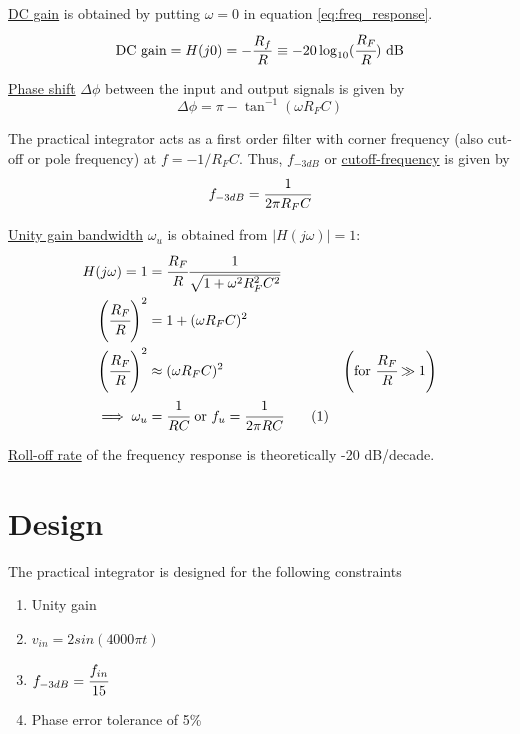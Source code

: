 \documentclass[12pt, titlepage]{article}
\theoremstyle{definition}
\newcommand\numberthis{\addtocounter{equation}{1}\tag{\theequation}}
\begin{document}
    \underline{DC gain} is obtained by putting $\omega = 0$ in equation \ref{eq:freq_response}.
    \begin{equation}
      \text{DC gain} = H(j0) = -\frac{R_f}{R} \equiv -20\log_{10}(\cfrac{R_F}{R}) \text{ dB}
    \end{equation}

    \underline{Phase shift} $\Delta\phi$ between the input and output signals is given by
    \begin{equation}\label{eq:phase_shift}
      \Delta\phi = \pi - \tan^{-1}(\omega R_FC)
    \end{equation}

    The practical integrator acts as a first order filter with corner frequency (also cut-off or pole frequency) at $f = -1/R_FC$.
    Thus, \underline{$f_{-3dB}$} or \underline{cutoff-frequency} is given by
    \begin{equation}\label{eq:f3db}
      f_{-3dB} = \cfrac{1}{2\pi R_FC}
    \end{equation}

    \underline{Unity gain bandwidth} $\omega_u$ is obtained from $|H(j\omega)| = 1$:
    \begin{align*}
      H(j\omega) = 1 &= \cfrac{R_{F}}{R}\cfrac{1}{\sqrt{1+\omega^{2}R_{F}^{2}C^{2}}} \\
      \left(\cfrac{R_F}{R}\right)^2 &= 1 + (\omega R_FC)^2 \\
      \left(\cfrac{R_F}{R}\right)^2 &\approx (\omega R_FC)^2 & \left(\text{for } \cfrac{R_F}{R} \gg 1\right)\\
      \implies \omega_u &= \cfrac{1}{RC} \text{ or } f_u = \cfrac{1}{2\pi RC}\numberthis \label{eq:unity_gain_bw}
    \end{align*}

    \underline{Roll-off rate} of the frequency response is theoretically -20 dB/decade.

  \newpage
  \section{Design}
    The practical integrator is designed for the following constraints
    \begin{enumerate}[topsep=1pt, label=(\alph*)]
      \item Unity gain
      \item $v_{in} = 2sin(4000\pi t)$
      \item $f_{-3dB} = \cfrac{f_{in}}{15}$
      \item Phase error tolerance of 5\%
    \end{enumerate}
\end{document}
